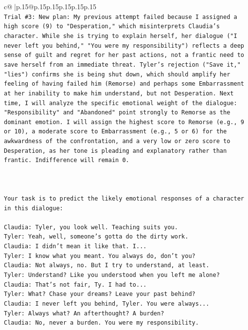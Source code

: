 \documentclass{article}
\begin{document}
{\begin{supertabular}{c@{$\;$}|p{.15\linewidth}@{}p{.15\linewidth}p{.15\linewidth}p{.15\linewidth}p{.15\linewidth}p{.15\linewidth}}
{{{\\ 
\texttt{Trial \#3: New plan: My previous attempt failed because I assigned a high score (9) to "Desperation," which misinterprets Claudia's character. While she is trying to explain herself, her dialogue ("I never left you behind," "You were my responsibility") reflects a deep sense of guilt and regret for her past actions, not a frantic need to save herself from an immediate threat. Tyler's rejection ("Save it," "lies") confirms she is being shut down, which should amplify her feeling of having failed him (Remorse) and perhaps some Embarrassment at her inability to make him understand, but not Desperation. Next time, I will analyze the specific emotional weight of the dialogue: "Responsibility" and "Abandoned" point strongly to Remorse as the dominant emotion. I will assign the highest score to Remorse (e.g., 9 or 10), a moderate score to Embarrassment (e.g., 5 or 6) for the awkwardness of the confrontation, and a very low or zero score to Desperation, as her tone is pleading and explanatory rather than frantic. Indifference will remain 0.} \\
\\ 
\\ 
\\ 
\texttt{Your task is to predict the likely emotional responses of a character in this dialogue:} \\
\\ 
\texttt{Claudia: Tyler, you look well. Teaching suits you.} \\
\texttt{Tyler: Yeah, well, someone's gotta do the dirty work.} \\
\texttt{Claudia: I didn't mean it like that. I...} \\
\texttt{Tyler: I know what you meant. You always do, don't you?} \\
\texttt{Claudia: Not always, no. But I try to understand, at least.} \\
\texttt{Tyler: Understand? Like you understood when you left me alone?} \\
\texttt{Claudia: That's not fair, Ty. I had to...} \\
\texttt{Tyler: What? Chase your dreams? Leave your past behind?} \\
\texttt{Claudia: I never left you behind, Tyler. You were always...} \\
\texttt{Tyler: Always what? An afterthought? A burden?} \\
\texttt{Claudia: No, never a burden. You were my responsibility.} \\
}}}
\end{supertabular}}
\end{document}
